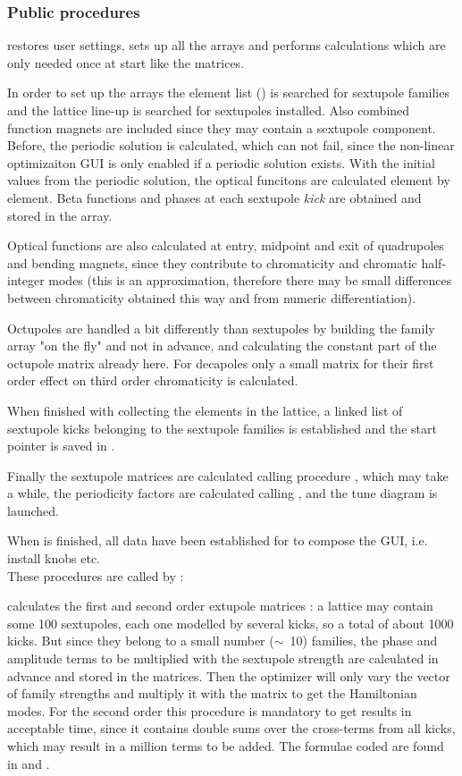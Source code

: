 \documentclass[12pt]{article}
\newcommand\code[1]{{\tt #1}}
\newcommand\guico[1]{{\color{blue}\code{#1}}}
\newcommand\guifco[1]{{\color{violet}\code{#1}}}
\newcommand{\unico}[1]{{\color{burntorange}\code{#1}}}
\newcommand{\opauni}[1]{\colorbox{orange!30}{{\color{black}\code{#1}}}}
\newcommand{\ouni}[1]{\hyperref[#1]{\opauni{#1}}}
\newcommand{\ppro}[1]{\subsubsection*{Public procedures} #1}
\begin{document}
\ppro{
\unico{ChromInit} restores user settings, sets up all the arrays and performs calculations which are only needed once at start like the \unico{SM1, SM2} matrices.

In order to set up the arrays the element list (\unico{Ella}) is searched for sextupole families and the lattice line-up is searched for sextupoles installed. Also combined function magnets are included since they may contain a sextupole component. Before, the periodic solution is calculated, which can not fail, since the non-linear optimizaiton GUI is only enabled if a periodic solution exists. With the initial values from the periodic solution, the optical funcitons are calculated element by element. Beta functions and phases at each sextupole {\em kick} are obtained and stored in the \unico{Sextupole} array. 

Optical functions are also calculated at entry, midpoint and exit of quadrupoles and bending magnets, since they contribute to chromaticity and chromatic half-integer modes (this is an approximation, therefore there may be small differences between chromaticity obtained this way and from numeric differentiation). 

Octupoles are handled a bit differently than sextupoles by building the \unico{OctuFam} family array "on the fly" and not in advance, and calculating the constant part of the octupole matrix \unico{omatpre, om1pre} already here. For decapoles only a small matrix \unico{dmat} for their first order effect on third order chromaticity is calculated.

When finished with collecting the elements in the lattice, a linked list of sextupole kicks belonging to the sextupole families is established and the start pointer is saved in \unico{SexFam.kid}. 

Finally the sextupole matrices \unico{SM1, SM2} are calculated calling procedure \unico{S\_Matrix}, which may take a while, the periodicity factors are calculated calling \unico{S\_Period}, and the tune diagram \ouni{opatunediag} is launched.

When \unico{ChromInit} is finished, all data have been established for  \guico{opachroma} to compose the GUI, i.e. install \guifco{csexframe} knobs etc.\\[1ex]

These procedures are called by \unico{ChromInit}:

\unico{S\_Matrix} calculates the first and second order extupole matrices \unico{SM1, SM2}: a lattice may contain some 100 sextupoles, each one modelled by several kicks, so a total of about 1000 kicks. But since they belong to a small number ($\sim$~10) families, the phase and amplitude terms to be multiplied with the sextupole strength are calculated in advance and stored in the matrices. Then the optimizer will only vary the vector of family strengths and multiply it with the matrix to get the Hamiltonian modes. For the second order this procedure is mandatory to get results in acceptable time, since it contains double sums over the cross-terms from all kicks, which may result in a million terms to be added. The formulae coded are found in \cite{jbsls} and \cite{WANG}.

}
\end{document}
